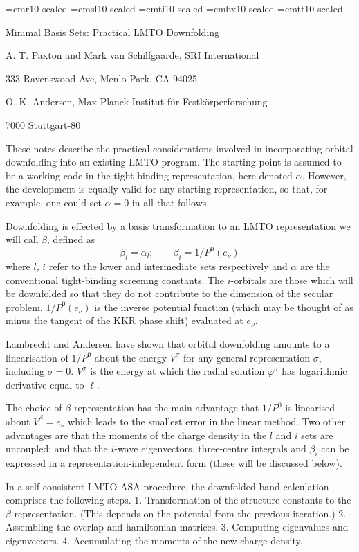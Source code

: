 \font\bigtenrm=cmr10 scaled
\font\bigsl=cmsl10 scaled
\font\bigit=cmti10 scaled
\font\bigbf=cmbx10 scaled
\font\type=cmtt10 scaled
\hsize 16.1cm \vsize 22cm
\baselineskip 18pt
\leftskip 0.5in
\bigskip
\bigbf
\bigskip

\centerline{\hfil Minimal Basis Sets:  Practical LMTO Downfolding\hfil}
\bigskip
\bigtenrm
\centerline{\hfil A. T. Paxton and Mark van Schilfgaarde,
SRI International\hfil}
\vskip5pt
\centerline{\hfil 333 Ravenswood Ave, Menlo Park, CA 94025\hfil}
\vskip15pt
\centerline{\hfil O. K. Andersen, Max-Planck Institut f\"ur
Festk\"orperforschung\hfil}
\vskip5pt
\centerline{\hfil 7000 Stuttgart-80\hfil}
\bigskip

These notes describe the practical considerations involved in
incorporating orbital downfolding into an existing LMTO program.
The starting point is assumed to be a working code in the tight-binding
representation, here denoted $\alpha$. However, the development is
equally valid for any starting representation, so that, for example,
one could set $\alpha=0$ in all that follows.

Downfolding is effected by a basis transformation to an LMTO
representation we will call $\beta$, defined as
$$\beta_l = \alpha_l;\qquad\beta_i=1/P^0(e_\nu)$$
where $l$, $i$ refer to the lower and intermediate
sets respectively and $\alpha$ are the conventional tight-binding
screening constants.
The $i$-orbitals are those which will be downfolded
so that they do not contribute to the dimension of the secular problem.
$1/P^0(e_\nu)$ is the inverse potential function (which
may be thought of as minus the tangent of the KKR phase shift) evaluated
at $e_\nu$.

Lambrecht and Andersen have shown that orbital downfolding amounts
to a linearisation of $1/P^0$ about the energy $V^\sigma$
for any general representation $\sigma$, including $\sigma=0$.
$V^\sigma$ is the energy at which the radial solution $\varphi^\sigma$
has logarithmic derivative equal to $\ell$.

The choice of $\beta$-representation has the main advantage that $1/P^0$
is linearised about $V^\beta=e_\nu$ which leads to the smallest error in
the linear method.  Two other advantages are that the moments of the
charge density in the $l$ and $i$ sets are uncoupled; and that the
$i$-wave eigenvectors, three-centre integrals and $\dot\beta_i$ can be
expressed in a representation-independent form (these will be discussed
below).

In a self-consistent LMTO-ASA procedure, the downfolded band
calculation comprises the following steps. 1. Transformation of
the structure constants to the $\beta$-representation. (This
depends on the potential from the previous iteration.) 2. Assembling
the overlap and hamiltonian matrices. 3. Computing eigenvalues and
eigenvectors. 4. Accumulating the moments of the new charge density.

